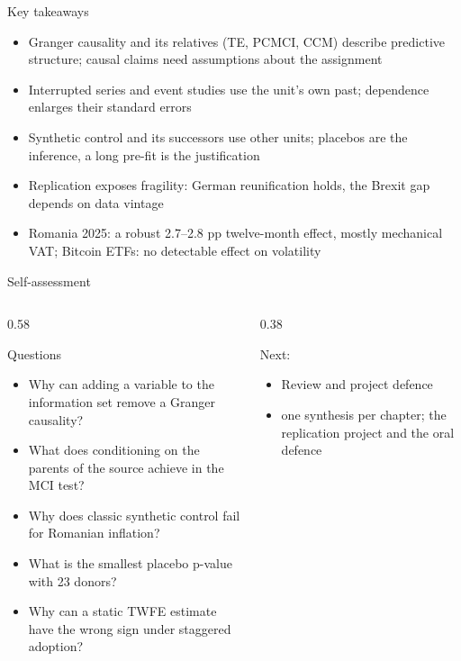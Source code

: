 \begin{frame}{Key takeaways}
\itemsize{\small}
\begin{itemize}
    \item Granger causality and its relatives (TE, PCMCI, CCM) describe predictive structure; causal claims need assumptions about the assignment
    \item Interrupted series and event studies use the unit's own past; dependence enlarges their standard errors
    \item Synthetic control and its successors use other units; placebos are the inference, a long pre-fit is the justification
    \item Replication exposes fragility: German reunification holds, the Brexit gap depends on data vintage
    \item Romania 2025: a robust 2.7--2.8 pp twelve-month effect, mostly mechanical VAT; Bitcoin ETFs: no detectable effect on volatility
\end{itemize}
\end{frame}

\begin{frame}{Self-assessment}
\itemsize{\small}
\begin{columns}[T]
\begin{column}{0.58\textwidth}
\begin{block}{Questions}
\begin{itemize}
    \item Why can adding a variable to the information set remove a Granger causality?
    \item What does conditioning on the parents of the source achieve in the MCI test?
    \item Why does classic synthetic control fail for Romanian inflation?
    \item What is the smallest placebo p-value with 23 donors?
    \item Why can a static TWFE estimate have the wrong sign under staggered adoption?
\end{itemize}
\end{block}
\end{column}
\begin{column}{0.38\textwidth}
\begin{block}{Next: }
\begin{itemize}
    \item Review and project defence
    \item one synthesis per chapter; the replication project and the oral defence
\end{itemize}
\end{block}
\end{column}
\end{columns}
\end{frame}


